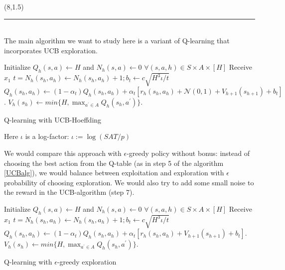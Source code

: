 \documentclass[a0]{a0poster}
\def\Head#1{\noindent{\LARGE\color{bluegray} #1}\bigskip}
\begin{document}
\begin{textblock}{7.0}(8,1.5)
\medskip
\hrule\medskip
\Head{Algorithm}\\
The main algorithm we want to study here is a variant of Q-learning that incorporates UCB exploration.
\begin{algorithm}[h!]
	\SetAlgoLined

	\label{UCBalg}
	\begin{algorithmic}[1]
		\STATE Initialize $Q_h(s, a) \leftarrow H$ and  $N_h(s, a)\leftarrow 0$ $\forall (s, a, h) \in S \times A \times \left[H\right] $
		\STATE Receive $x_1$
		\STATE $t=N_h(s_h,a_h)\leftarrow N_h(s_h,a_h)+1; b_t \leftarrow c\sqrt{H^3\iota /t}$
		\STATE $Q_h(s_h, a_h) \leftarrow (1 - \alpha_t)Q_h(s_h, a_h) + \alpha_t[r_h(s_h, a_h) + \mathcal{N}(0,1)+ V_{h+1}(s_{h+1}) + b_t]$. $V_h(s_h) \leftarrow min\{H, \max_{a^{'}\in A} Q_h(s_h, a^{'})\}$.
		\ENDFOR
		\ENDFOR
	\end{algorithmic}
	\caption{Q-learning with UCB-Hoeffding}
\end{algorithm}

Here $\iota$ is a log-factor: $\iota := \log(SAT/p)$


We would compare this approach with $\epsilon$-greedy policy without bonus: instead of choosing the best action from the Q-table (as in step 5 of the algorithm \ref{UCBalg}), we would balance between exploitation and exploration with $\epsilon$ probability of choosing exploration. We would also try to add some small noise to the reward in the UCB-algorithm (step 7).


\begin{algorithm}[h!]
	\SetAlgoLined
	
	\label{UCBalg}
	\begin{algorithmic}[1]
		\STATE Initialize $Q_h(s, a) \leftarrow H$ and  $N_h(s, a)\leftarrow 0$ $\forall (s, a, h) \in S \times A \times \left[H\right] $
		\STATE Receive $x_1$
		\STATE $t=N_h(s_h,a_h)\leftarrow N_h(s_h,a_h)+1; b_t \leftarrow c\sqrt{H^3\iota /t}$
		\STATE $Q_h(s_h, a_h) \leftarrow (1 - \alpha_t)Q_h(s_h, a_h) + \alpha_t[r_h(s_h, a_h) + V_{h+1}(s_{h+1}) + b_t]$. $V_h(s_h) \leftarrow min\{H, \max_{a^{'}\in A} Q_h(s_h, a^{'})\}$.
		\ENDFOR
		\ENDFOR
	\end{algorithmic}
	\caption{Q-learning with $\epsilon$-greedy exploration}
\end{algorithm}




\end{textblock}
\end{document}
